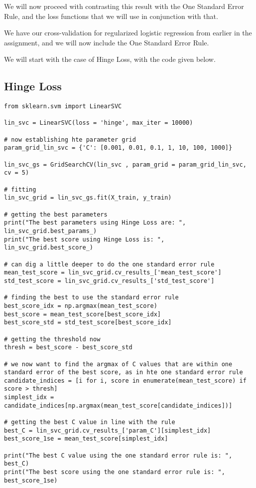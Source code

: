 \documentclass[12pt, letterpaper]{article}
\begin{document}
We will now proceed with contrasting this result with the One Standard Error Rule, and the loss functions that we will use in conjunction with that. 

We have our cross-validation for regularized logistic regression from earlier in the assignment, and we will now include the One Standard Error Rule. 

We will start with the case of Hinge Loss, with the code given below. 

\subsection{Hinge Loss} 

\begin{verbatim} 
from sklearn.svm import LinearSVC 

lin_svc = LinearSVC(loss = 'hinge', max_iter = 10000) 

# now establishing hte parameter grid 
param_grid_lin_svc = {'C': [0.001, 0.01, 0.1, 1, 10, 100, 1000]}

lin_svc_gs = GridSearchCV(lin_svc , param_grid = param_grid_lin_svc, cv = 5) 

# fitting 
lin_svc_grid = lin_svc_gs.fit(X_train, y_train) 

# getting the best parameters 
print("The best parameters using Hinge Loss are: ", lin_svc_grid.best_params_) 
print("The best score using Hinge Loss is: ", lin_svc_grid.best_score_) 

# can dig a little deeper to do the one standard error rule 
mean_test_score = lin_svc_grid.cv_results_['mean_test_score']
std_test_score = lin_svc_grid.cv_results_['std_test_score']

# finding the best to use the standard error rule 
best_score_idx = np.argmax(mean_test_score) 
best_score = mean_test_score[best_score_idx]
best_score_std = std_test_score[best_score_idx]

# getting the threshold now 
thresh = best_score - best_score_std 

# we now want to find the argmax of C values that are within one standard error of the best score, as in hte one standard error rule 
candidate_indices = [i for i, score in enumerate(mean_test_score) if score > thresh]
simplest_idx = candidate_indices[np.argmax(mean_test_score[candidate_indices])] 

# getting the best C value in line with the rule 
best_C = lin_svc_grid.cv_results_['param_C'][simplest_idx]
best_score_1se = mean_test_score[simplest_idx] 

print("The best C value using the one standard error rule is: ", best_C) 
print("The best score using the one standard error rule is: ", best_score_1se) 
\end{verbatim} 
\end{document}
